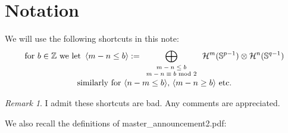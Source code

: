 \documentclass[12pt]{article} %
\theoremstyle{plain}
\theoremstyle{remark}
\newtheorem{remark}{Remark}
\begin{document}
\section{Notation}
We will use the following shortcuts in this note:\begin{equation*}
	\begin{array}[]{c}
		\mbox{for $b\in\Z$ we let }\myabra{m-n\le b}:=\displaystyle\bigoplus_{\scriptsize \begin{array}[]{c}
			m-n\le b\\ m-n\equiv b\mbox{ mod 2}
		\end{array}}\mathcal{H}^m(\Sp^{p-1})\otimes \mathcal{H}^n(\Sp^{q-1})\\
		\mbox{similarly for $\myabra{n-m\le b}$, $\myabra{m-n\ge b}$ etc.}
	\end{array}
\end{equation*}
\begin{remark}
	I admit these shortcuts are bad. Any comments are appreciated.
\end{remark}
We also recall the definitions of {\ttfamily master\_announcement2.pdf}:
\end{document}

